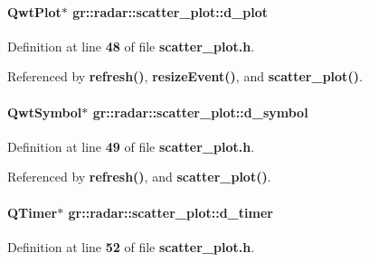 \paragraph[{d\+\_\+plot}]{\setlength{\rightskip}{0pt plus 5cm}Qwt\+Plot$\ast$ gr\+::radar\+::scatter\+\_\+plot\+::d\+\_\+plot\hspace{0.3cm}{\ttfamily [private]}}\label{classgr_1_1radar_1_1scatter__plot_a95b8c2e3e73bc63892a5d0413e0b554d}


Definition at line {\bf 48} of file {\bf scatter\+\_\+plot.\+h}.



Referenced by {\bf refresh()}, {\bf resize\+Event()}, and {\bf scatter\+\_\+plot()}.

\paragraph[{d\+\_\+symbol}]{\setlength{\rightskip}{0pt plus 5cm}Qwt\+Symbol$\ast$ gr\+::radar\+::scatter\+\_\+plot\+::d\+\_\+symbol\hspace{0.3cm}{\ttfamily [private]}}\label{classgr_1_1radar_1_1scatter__plot_adccb06431a872cb2fb6e5d95c0090de9}


Definition at line {\bf 49} of file {\bf scatter\+\_\+plot.\+h}.



Referenced by {\bf refresh()}, and {\bf scatter\+\_\+plot()}.

\paragraph[{d\+\_\+timer}]{\setlength{\rightskip}{0pt plus 5cm}Q\+Timer$\ast$ gr\+::radar\+::scatter\+\_\+plot\+::d\+\_\+timer\hspace{0.3cm}{\ttfamily [private]}}\label{classgr_1_1radar_1_1scatter__plot_a560d8dfeb5e9a13c52907e3d8e662bca}


Definition at line {\bf 52} of file {\bf scatter\+\_\+plot.\+h}.



